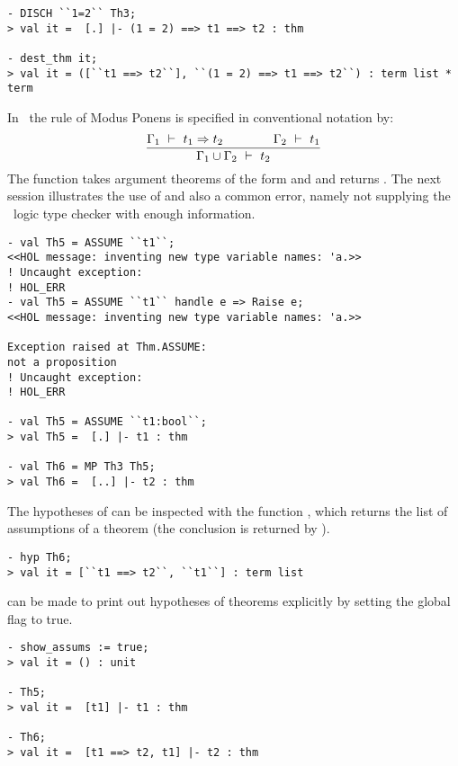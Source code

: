 \begin{session}\begin{verbatim}
- DISCH ``1=2`` Th3;
> val it =  [.] |- (1 = 2) ==> t1 ==> t2 : thm

- dest_thm it;
> val it = ([``t1 ==> t2``], ``(1 = 2) ==> t1 ==> t2``) : term list * term
\end{verbatim}\end{session}

    In \HOL\, the rule  of Modus Ponens is specified in
    conventional notation by:
\[
\frac{\Gamma_1 \ \vdash\  t_1 \Rightarrow t_2 \qquad\qquad \Gamma_2\ \vdash\  t_1}
{\Gamma_1 \cup \Gamma_2 \ \vdash\  t_2}
\]
The \ML{} function  takes argument theorems of the form
 and  and
returns . The next session illustrates the use
of  and also a common error, namely not supplying the \HOL\
logic type checker with enough information.

\begin{session}\begin{verbatim}
- val Th5 = ASSUME ``t1``;
<<HOL message: inventing new type variable names: 'a.>>
! Uncaught exception:
! HOL_ERR
- val Th5 = ASSUME ``t1`` handle e => Raise e;
<<HOL message: inventing new type variable names: 'a.>>

Exception raised at Thm.ASSUME:
not a proposition
! Uncaught exception:
! HOL_ERR

- val Th5 = ASSUME ``t1:bool``;
> val Th5 =  [.] |- t1 : thm

- val Th6 = MP Th3 Th5;
> val Th6 =  [..] |- t2 : thm
\end{verbatim}\end{session}

The hypotheses of  can be inspected with the \ML{} function
\ml{hyp}, which returns the list of assumptions of a theorem (the
conclusion is returned by \ml{concl}).

\begin{session}\begin{verbatim}
- hyp Th6;
> val it = [``t1 ==> t2``, ``t1``] : term list
\end{verbatim}\end{session}

    \HOL{} can be made to print out hypotheses of theorems explicitly
    by setting the global flag \ml{show\_assums} to true.

\begin{session}\begin{verbatim}
- show_assums := true;
> val it = () : unit

- Th5;
> val it =  [t1] |- t1 : thm

- Th6;
> val it =  [t1 ==> t2, t1] |- t2 : thm
\end{verbatim}\end{session}


